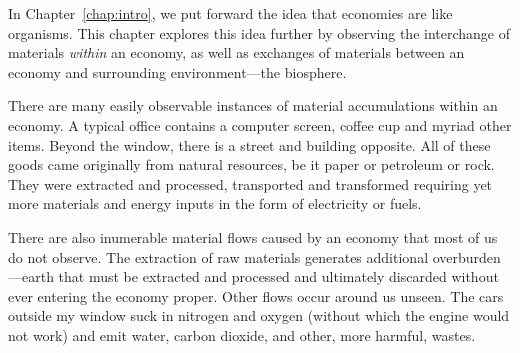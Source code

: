 
In Chapter~\ref{chap:intro}, we put forward the idea that economies are like organisms. 
This chapter explores
this idea further by observing the interchange of materials \emph{within}
an economy, as well as exchanges of materials between an economy and 
surrounding environment---the biosphere. 


 

There are many easily observable instances of material accumulations
within an economy. 
A typical office contains a computer screen, coffee cup
and myriad other items. 
Beyond the window, there is a street and building
opposite. 
All of these goods came originally from natural 
resources, 
be it paper or petroleum or rock. They were extracted and processed, transported and
transformed requiring yet more materials and energy inputs in the form of
electricity or fuels. 

There are also inumerable material flows caused by an economy that 
most of us do not observe.
The extraction of raw materials generates additional overburden---earth that must be
extracted and processed and ultimately discarded without ever entering the economy
proper. Other flows occur around us unseen. The cars outside my window suck in nitrogen
and oxygen (without which the engine would not work) and emit water, carbon dioxide, and
other, more harmful, wastes. 

